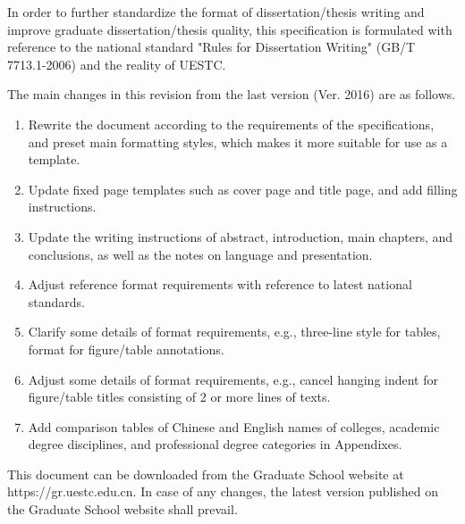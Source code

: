 \begin{abstract*}
  In order to further standardize the format of dissertation/thesis writing and improve graduate dissertation/thesis quality, this specification is formulated with reference to the national standard "Rules for Dissertation Writing" (GB/T 7713.1-2006) and the reality of UESTC.

  The main changes in this revision from the last version (Ver. 2016) are as follows.

  \begin{enumerate}
    \item Rewrite the document according to the requirements of the specifications, and preset main formatting styles, which makes it more suitable for use as a template.
    \item Update fixed page templates such as cover page and title page, and add filling instructions.
    \item Update the writing instructions of abstract, introduction, main chapters, and conclusions, as well as the notes on language and presentation.
    \item Adjust reference format requirements with reference to latest national standards.
    \item Clarify some details of format requirements, e.g., three-line style for tables, format for figure/table annotations.
    \item Adjust some details of format requirements, e.g., cancel hanging indent for figure/table titles consisting of 2 or more lines of texts.
    \item Add comparison tables of Chinese and English names of colleges, academic degree disciplines, and professional degree categories in Appendixes.
  \end{enumerate}

  This document can be downloaded from the Graduate School website at https://gr.uestc.edu.cn. In case of any changes, the latest version published on the Graduate School website shall prevail.

\end{abstract*}
